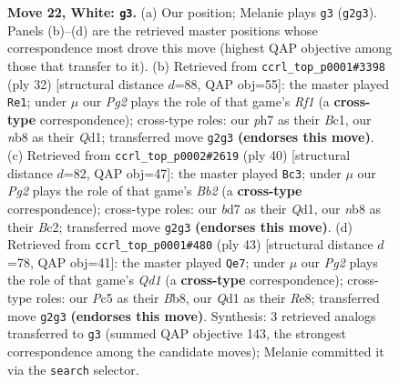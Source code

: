 \documentclass[11pt]{article}
\begin{document}
\begin{figure}[p]
\caption{\textbf{Move 22, White: \texttt{g3}.} (a) Our position; Melanie plays \texttt{g3} (\texttt{g2g3}). Panels (b)--(d) are the retrieved master positions whose correspondence most drove this move (highest QAP objective among those that transfer to it). (b) Retrieved from \texttt{ccrl\_top\_p0001\#3398} (ply 32) [structural distance $d$=88, QAP obj=55]: the master played \texttt{Re1}; under $\mu$ our \emph{Pg2} plays the role of that game's \emph{Rf1} (a \textbf{cross-type} correspondence); cross-type roles: our \emph{p}h7 as their \emph{B}c1, our \emph{n}b8 as their \emph{Q}d1; transferred move \texttt{g2g3} \textbf{(endorses this move)}. (c) Retrieved from \texttt{ccrl\_top\_p0002\#2619} (ply 40) [structural distance $d$=82, QAP obj=47]: the master played \texttt{Bc3}; under $\mu$ our \emph{Pg2} plays the role of that game's \emph{Bb2} (a \textbf{cross-type} correspondence); cross-type roles: our \emph{b}d7 as their \emph{Q}d1, our \emph{n}b8 as their \emph{B}c2; transferred move \texttt{g2g3} \textbf{(endorses this move)}. (d) Retrieved from \texttt{ccrl\_top\_p0001\#480} (ply 43) [structural distance $d$=78, QAP obj=41]: the master played \texttt{Qe7}; under $\mu$ our \emph{Pg2} plays the role of that game's \emph{Qd1} (a \textbf{cross-type} correspondence); cross-type roles: our \emph{P}c5 as their \emph{B}b8, our \emph{Q}d1 as their \emph{R}e8; transferred move \texttt{g2g3} \textbf{(endorses this move)}. Synthesis: 3 retrieved analogs transferred to \texttt{g3} (summed QAP objective 143, the strongest correspondence among the candidate moves); Melanie committed it via the \texttt{search} selector.}
\label{fig:thought-m42}
\end{figure}

\clearpage
\end{document}
